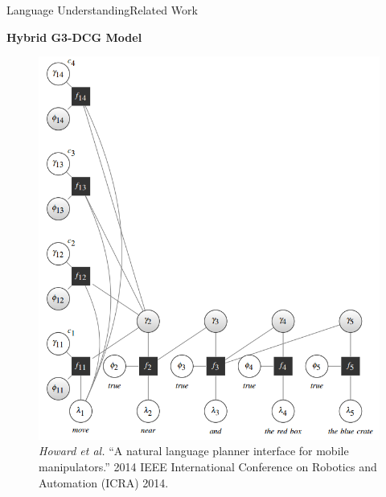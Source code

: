 \begin{frame}{Language Understanding}{Related Work}

{\bf Hybrid G3-DCG Model }

\begin{figure}
	\centering
	\includegraphics[width=.35\linewidth]{figure/hybrid_G3_DCG}
	\caption{ \tiny{ {\it Howard et al.} ``A natural language planner interface for mobile manipulators.'' 2014 IEEE International Conference on Robotics and Automation (ICRA) 2014. } }
\end{figure}

\end{frame}